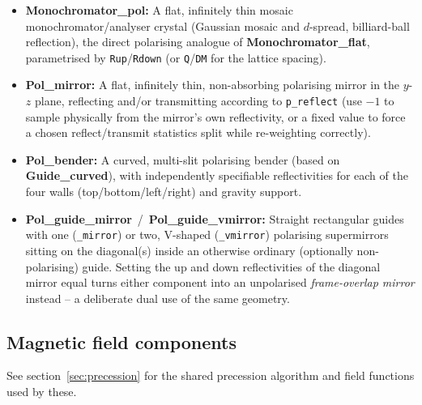\begin{itemize}
\item \textbf{Monochromator\_pol:} A flat, infinitely thin mosaic
  monochromator/analyser crystal (Gaussian mosaic and $d$-spread,
  billiard-ball reflection), the direct polarising analogue of
  \textbf{Monochromator\_flat}, parametrised by \texttt{Rup}/\texttt{Rdown}
  (or \texttt{Q}/\texttt{DM} for the lattice spacing).
\item \textbf{Pol\_mirror:} A flat, infinitely thin, non-absorbing
  polarising mirror in the $y$-$z$ plane, reflecting and/or transmitting
  according to \texttt{p\_reflect} (use $-1$ to sample physically from the
  mirror's own reflectivity, or a fixed value to force a chosen
  reflect/transmit statistics split while re-weighting correctly).
\item \textbf{Pol\_bender:} A curved, multi-slit polarising bender (based
  on \textbf{Guide\_curved}), with independently specifiable
  reflectivities for each of the four walls (top/bottom/left/right) and
  gravity support.
\item \textbf{Pol\_guide\_mirror}\ /\ \textbf{Pol\_guide\_vmirror:}
  Straight rectangular guides with one (\texttt{\_mirror}) or two,
  V-shaped (\texttt{\_vmirror}) polarising supermirrors sitting on the
  diagonal(s) inside an otherwise ordinary (optionally non-polarising)
  guide. Setting the up and down reflectivities of the diagonal mirror
  equal turns either component into an unpolarised \emph{frame-overlap
  mirror} instead -- a deliberate dual use of the same geometry.
\end{itemize}

\subsection{Magnetic field components}
\label{sub:fieldcomps}

See section~\ref{sec:precession} for the shared precession algorithm and
field functions used by these.

